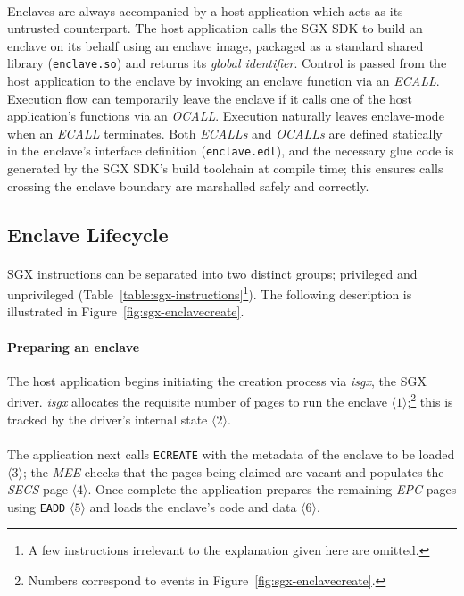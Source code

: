 \paragraph{} Enclaves are always accompanied by a host application which acts as its untrusted counterpart. The host application calls the SGX SDK to build an enclave on its behalf using an enclave image, packaged as a standard shared library (\texttt{enclave.so}) and returns its \textit{global identifier}. Control is passed from the host application to the enclave by invoking an enclave function via an \textit{ECALL}. Execution flow can temporarily leave the enclave if it calls one of the host application's functions via an \textit{OCALL}. Execution naturally leaves enclave-mode when an \textit{ECALL} terminates. Both \textit{ECALLs} and \textit{OCALLs} are defined statically in the enclave's interface definition (\texttt{enclave.edl}), and the necessary glue code is generated by the SGX SDK's build toolchain at compile time; this ensures calls crossing the enclave boundary are marshalled safely and correctly.


\subsection{Enclave Lifecycle}
\label{sec:sgx-lifecycle}

\paragraph{} SGX instructions can be separated into two distinct groups; privileged and unprivileged (Table~\ref{table:sgx-instructions}\footnote{A few instructions irrelevant to the explanation given here are omitted.}). The following description is illustrated in Figure~\ref{fig:sgx-enclavecreate}.

\paragraph{Preparing an enclave} The host application begins initiating the creation process via \textit{isgx}, the SGX driver. \textit{isgx} allocates the requisite number of pages to run the enclave $\langle 1 \rangle$;\footnote{Numbers correspond to events in Figure~\ref{fig:sgx-enclavecreate}.} this is tracked by the driver's internal state $\langle 2 \rangle$.

\paragraph{} The application next calls \texttt{ECREATE} with the metadata of the enclave to be loaded $\langle 3 \rangle$; the \textit{MEE} checks that the pages being claimed are vacant and populates the \textit{SECS} page $\langle 4 \rangle$. Once complete the application prepares the remaining \textit{EPC} pages using \texttt{EADD} $\langle 5 \rangle$ and loads the enclave's code and data $\langle 6 \rangle$.

